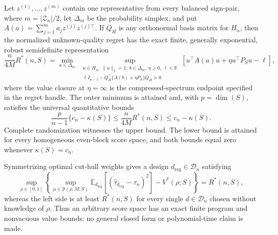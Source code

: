 Let \(z^{(1)},\ldots,z^{(m)}\) contain one representative from every balanced sign-pair, where \(m=|\mathcal Z_n|/2\), let \(\Delta_m\) be the probability simplex, and put \(A(a)=\sum_{j=1}^m a_jz^{(j)}z^{(j)\top}\).  If \(Q_H\) is any orthonormal basis matrix for \(H_n\), then the normalized unknown-quality regret has the exact finite, generally exponential, robust semidefinite representation
\[
\frac{n}{4M}R^*(n,S)
=\min_{a\in\Delta_m}\ \sup_{\substack{u\in H_n,\ \|u\|_2=1;\ b\in\Delta_m,\ \eta\geq0,\ \ell\in\mathbb R\\
\ell I_{n-1}-Q_H^\top\{A(b)+\eta P_S\}Q_H\succeq0}}
\left[u^\top A(a)u+\eta u^\top P_Su-\ell\right],
\]
where the value closure at \(\eta=\infty\) is the compressed-spectrum endpoint specified in the regret handle.  The outer minimum is attained and, with \(p=\dim(S)\), satisfies the universal quantitative bounds
\[
\frac{p}{n-1}\{c_n-\kappa(S)\}
\leq\frac{n}{4M}R^*(n,S)
\leq c_n-\kappa(S).
\]
Complete randomization witnesses the upper bound.  The lower bound is attained for every homogeneous even-block score space, and both bounds equal zero whenever \(\kappa(S)=c_n\).

Symmetrizing optimal cut-hull weights gives a design \(d_{\mathrm{reg}}\in\mathcal D_n\) satisfying
\[
\sup_{\rho\in[0,1]}
\left\{
\sup_{\mu\in\mathcal Y(\rho,M;S)}
\mathbb E_{d_{\mathrm{reg}}}[(\widehat\tau_{d_{\mathrm{reg}}}-\tau_n)^2]
-V^*(\rho;S)
\right\}=R^*(n,S),
\]
whereas the left side is at least \(R^*(n,S)\) for every single \(d\in\mathcal D_n\) chosen without knowledge of \(\rho\).  Thus an arbitrary score space has an exact finite program and nonvacuous value bounds; no general closed form or polynomial-time claim is made.